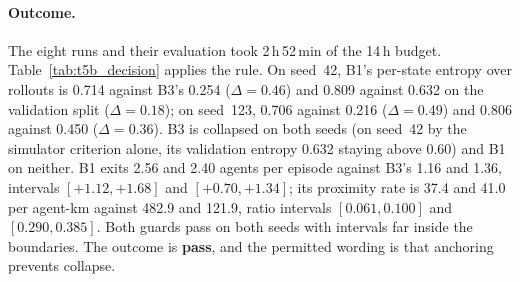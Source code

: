 \paragraph{Outcome.}
The eight runs and their evaluation took 2\,h\,52\,min of the 14\,h budget. Table~\ref{tab:t5b_decision} applies the rule. On seed~42, B1's per-state entropy over rollouts is 0.714 against B3's 0.254 ($\Delta=0.46$) and 0.809 against 0.632 on the validation split ($\Delta=0.18$); on seed~123, 0.706 against 0.216 ($\Delta=0.49$) and 0.806 against 0.450 ($\Delta=0.36$). B3 is collapsed on both seeds (on seed~42 by the simulator criterion alone, its validation entropy 0.632 staying above 0.60) and B1 on neither. B1 exits 2.56 and 2.40 agents per episode against B3's 1.16 and 1.36, intervals $[+1.12,+1.68]$ and $[+0.70,+1.34]$; its proximity rate is 37.4 and 41.0 per agent-km against 482.9 and 121.9, ratio intervals $[0.061,0.100]$ and $[0.290,0.385]$. Both guards pass on both seeds with intervals far inside the boundaries. The outcome is \textbf{pass}, and the permitted wording is that anchoring prevents collapse.

